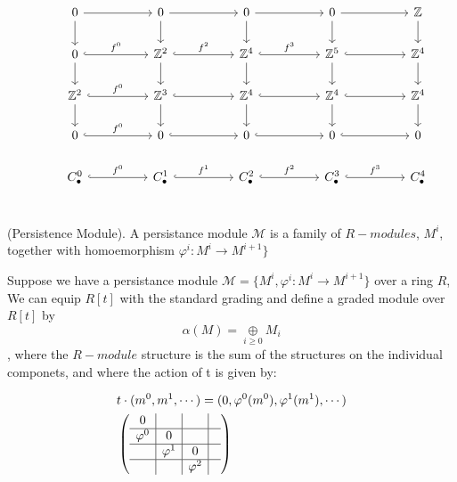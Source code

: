 \documentclass[11pt,a4paper]{report}
\begin{document}
\begin{Ex}
              \[
                \begin{tikzcd}[ampersand replacement=\&]
                  \& 0 \arrow[rr] \arrow[d]                      \&\& 0 \arrow[rr] \arrow[d]                                \&\& 0 \arrow[rr] \arrow[d]                            \&\& 0 \arrow[rr] \arrow[d]                            \&\& \mathbb{Z} \arrow[d]\\
                  \& 0 \arrow[hookrightarrow]{rr}{f^0} \arrow[d] \&\& \mathbb{Z}^2 \arrow[hookrightarrow]{rr}{f^2} \arrow[d] \&\& \mathbb{Z}^4 \arrow[hookrightarrow]{rr}{f^3} \arrow[d] \&\& \mathbb{Z}^5 \arrow[d] \arrow[hookrightarrow]{rr} \&\& \mathbb{Z}^4 \arrow[d]\\
                  \& \mathbb{Z}^2 \arrow[hookrightarrow]{rr}{f^0} \arrow[d] \&\& \mathbb{Z}^3 \arrow[hookrightarrow]{rr} \arrow[d] \&\& \mathbb{Z}^4 \arrow[hookrightarrow]{rr} \arrow[d] \&\& \mathbb{Z}^4 \arrow[d] \arrow[hookrightarrow]{rr} \&\& \mathbb{Z}^4 \arrow[d]\\
                  \& 0 \arrow[hookrightarrow]{rr}{f^0}           \&\& 0 \arrow[hookrightarrow]{rr}         \&\& 0 \arrow[hookrightarrow]{rr}          \&\& 0 \arrow[hookrightarrow]{rr} \&\& 0 \\
                  \& C_\bullet^0 \arrow[hookrightarrow]{rr}{f^0}       \&\& C_\bullet^1 \arrow[hookrightarrow]{rr}{f^1} \&\& C_\bullet^2 \arrow[hookrightarrow]{rr}{f^2} \&\& C_\bullet^3 \arrow[hookrightarrow]{rr}{f^3} \&\& C_\bullet^4 \\
                \end{tikzcd}
              \]
             \end{Ex}
             
             \begin{defn} (Persistence Module). A persistance module $\mathcal{M}$ is a family of $R-modules$, $M^i$, together
             with homoemorphism $\varphi^i: M^i \rightarrow M^{i+1}\}$
             \end{defn}

             Suppose we have a persistance module  $\mathcal{M} = \{M^i, \varphi^i: M^i \rightarrow M^{i+1}\}$ over a
             ring $R$, We can equip $R[t]$ with the standard grading and define a graded module over $R[t]$ by
                \[ \alpha(M) = \underset{i \ge 0}{\oplus} M_i \], 
                where the $R-module$ structure is the sum of the structures on the individual componets, and where the action of t is given by:
                
              \begin{align*}
                &t \cdot(m^0,m^1, \cdots) = (0, \varphi^0(m^0), \varphi^1(m^1), \cdots)\\
                &\left(\begin{array}{c|c|c|c}
                        0 &&& \\ \hline \varphi^0 & 0 && \\ \hline & \varphi^1 & 0 & \\ \hline && \varphi^2 &
                      \end{array}\right)
              \end{align*}
              
\end{document}
